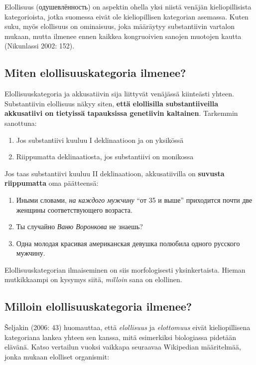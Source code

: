 \documentclass[]{scrartcl}
\providecommand{\tightlist}{%
  \setlength{\itemsep}{0pt}\setlength{\parskip}{0pt}}
\begin{document}
Elollisuus (одушевлённость) on aspektin ohella yksi niistä venäjän
kieliopillisista kategorioista, jotka suomessa eivät ole kieliopillisen
kategorian asemassa. Kuten suku, myös elollisuus on ominaisuus, joka
määräytyy substantiivin vartalon mukaan, mutta ilmenee ennen kaikkea
kongruoivien sanojen muotojen kautta (Nikunlassi 2002: 152).

\subsection{Miten elollisuuskategoria
ilmenee?}\label{miten-elollisuuskategoria-ilmenee}

Elollisuuskategoria ja akkusatiivin sija liittyvät venäjässä kiinteästi
yhteen. Substantiivin elollisuus näkyy siten, \textbf{että elollisilla
substantiiveilla akkusatiivi on tietyissä tapauksissa genetiivin
kaltainen}. Tarkemmin sanottuna:

\begin{enumerate}
\def\labelenumi{\arabic{enumi}.}
\tightlist
\item
  Jos substantiivi kuuluu I deklinaatioon ja on yksikössä
\item
  Riippumatta deklinaatiosta, jos substantiivi on monikossa
\end{enumerate}

Jos taas substantiivi kuuluu II deklinaatioon, akkusatiivilla on
\textbf{suvusta riippumatta} oma päätteensä:

\begin{enumerate}
\def\labelenumi{(\arabic{enumi})}
\setcounter{enumi}{107}
\tightlist
\item
  Иными словами, \emph{на каждого мужчину} ``от 35 и выше'' приходится
  почти две женщины соответствующего возраста.
\item
  Ты случайно \emph{Ваню Воронкова} не знаешь?
\item
  Одна молодая красивая американская девушка полюбила одного русского
  мужчину.
\end{enumerate}

Elollisuuskategorian ilmaiseminen on siis morfologisesti yksinkertaista.
Hieman mutkikkaampi on kysymys siitä, \emph{milloin} sana on elollinen.

\subsection{Milloin elollisuuskategoria
ilmenee?}\label{milloin-elollisuuskategoria-ilmenee}

Šeljakin (2006: 43) huomauttaa, että \emph{elollisuus} ja
\emph{elottomuus} eivät kieliopillisena kategoriana lankea yhteen sen
kanssa, mitä esimerkiksi biologiassa pidetään elävänä. Katso vertailun
vuoksi vaikkapa seuraavaa Wikipedian määritelmää, jonka mukaan elolliset
organismit:
\end{document}
